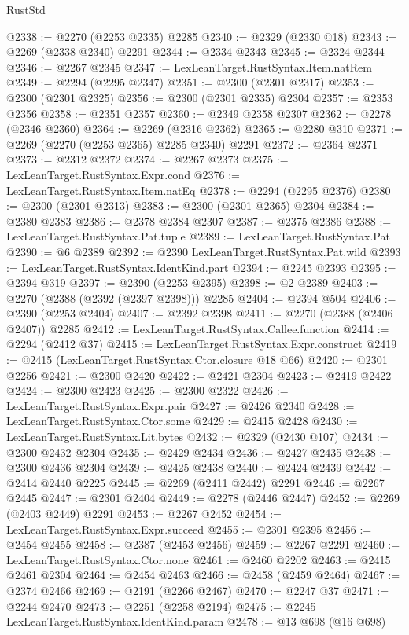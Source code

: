 \begin{lexlean}{RustStd}
\begin{coremodule}
@2338 := @2270 (@2253 @2335) @2285
@2340 := @2329 (@2330 @18)
@2343 := @2269 (@2338 @2340) @2291
@2344 := @2334 @2343
@2345 := @2324 @2344
@2346 := @2267 @2345
@2347 := LexLeanTarget.RustSyntax.Item.natRem
@2349 := @2294 (@2295 @2347)
@2351 := @2300 (@2301 @2317)
@2353 := @2300 (@2301 @2325)
@2356 := @2300 (@2301 @2335) @2304
@2357 := @2353 @2356
@2358 := @2351 @2357
@2360 := @2349 @2358 @2307
@2362 := @2278 (@2346 @2360)
@2364 := @2269 (@2316 @2362)
@2365 := @2280 @310
@2371 := @2269 (@2270 (@2253 @2365) @2285 @2340) @2291
@2372 := @2364 @2371
@2373 := @2312 @2372
@2374 := @2267 @2373
@2375 := LexLeanTarget.RustSyntax.Expr.cond
@2376 := LexLeanTarget.RustSyntax.Item.natEq
@2378 := @2294 (@2295 @2376)
@2380 := @2300 (@2301 @2313)
@2383 := @2300 (@2301 @2365) @2304
@2384 := @2380 @2383
@2386 := @2378 @2384 @2307
@2387 := @2375 @2386
@2388 := LexLeanTarget.RustSyntax.Pat.tuple
@2389 := LexLeanTarget.RustSyntax.Pat
@2390 := @6 @2389
@2392 := @2390 LexLeanTarget.RustSyntax.Pat.wild
@2393 := LexLeanTarget.RustSyntax.IdentKind.part
@2394 := @2245 @2393
@2395 := @2394 @319
@2397 := @2390 (@2253 @2395)
@2398 := @2 @2389
@2403 := @2270 (@2388 (@2392 (@2397 @2398))) @2285
@2404 := @2394 @504
@2406 := @2390 (@2253 @2404)
@2407 := @2392 @2398
@2411 := @2270 (@2388 (@2406 @2407)) @2285
@2412 := LexLeanTarget.RustSyntax.Callee.function
@2414 := @2294 (@2412 @37)
@2415 := LexLeanTarget.RustSyntax.Expr.construct
@2419 := @2415 (LexLeanTarget.RustSyntax.Ctor.closure @18 @66)
@2420 := @2301 @2256
@2421 := @2300 @2420
@2422 := @2421 @2304
@2423 := @2419 @2422
@2424 := @2300 @2423
@2425 := @2300 @2322
@2426 := LexLeanTarget.RustSyntax.Expr.pair
@2427 := @2426 @2340
@2428 := LexLeanTarget.RustSyntax.Ctor.some
@2429 := @2415 @2428
@2430 := LexLeanTarget.RustSyntax.Lit.bytes
@2432 := @2329 (@2430 @107)
@2434 := @2300 @2432 @2304
@2435 := @2429 @2434
@2436 := @2427 @2435
@2438 := @2300 @2436 @2304
@2439 := @2425 @2438
@2440 := @2424 @2439
@2442 := @2414 @2440 @2225
@2445 := @2269 (@2411 @2442) @2291
@2446 := @2267 @2445
@2447 := @2301 @2404
@2449 := @2278 (@2446 @2447)
@2452 := @2269 (@2403 @2449) @2291
@2453 := @2267 @2452
@2454 := LexLeanTarget.RustSyntax.Expr.succeed
@2455 := @2301 @2395
@2456 := @2454 @2455
@2458 := @2387 (@2453 @2456)
@2459 := @2267 @2291
@2460 := LexLeanTarget.RustSyntax.Ctor.none
@2461 := @2460 @2202
@2463 := @2415 @2461 @2304
@2464 := @2454 @2463
@2466 := @2458 (@2459 @2464)
@2467 := @2374 @2466
@2469 := @2191 (@2266 @2467)
@2470 := @2247 @37
@2471 := @2244 @2470
@2473 := @2251 (@2258 @2194)
@2475 := @2245 LexLeanTarget.RustSyntax.IdentKind.param
@2478 := @13 @698 (@16 @698)

\end{coremodule}
\end{lexlean}
